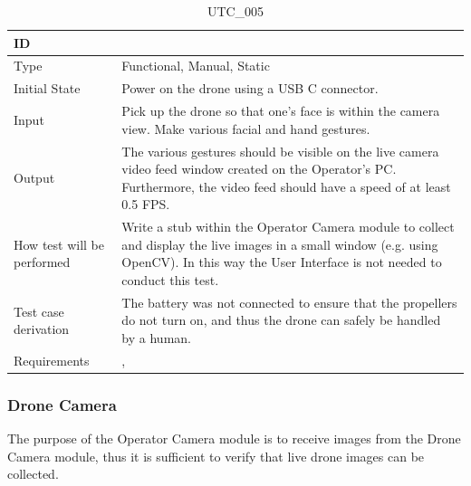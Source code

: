 \documentclass[12pt, titlepage]{article}
\begin{document}
\begin{table}[!h]
\begin{center}
\caption {UTC\_005}
\label{tab:UTC_005}
\begin{tabular}{ | m{3.2cm} | m{12.2cm} | } 
\hline
ID & \nameref{tab:UTC_005} \\ 
\hline
Type &  Functional, Manual, Static  \\ 
\hline
Initial State &  Power on the drone using a USB C connector. \\ 
\hline
Input & Pick up the drone so that one's face is within the camera view. Make various facial and hand gestures.\\ 
\hline
Output &  The various gestures should be visible on the live camera video feed window created on the Operator's PC. Furthermore, the video feed should have a speed of at least 0.5 FPS. \\ 
\hline
How test will be performed & Write a stub within the Operator Camera module to collect and display the live images in a small window (e.g. using OpenCV). In this way the User Interface is not needed to conduct this test. \\ 
\hline
Test case derivation &  The battery was not connected to ensure that the propellers do not turn on, and thus the drone can safely be handled by a human. \\ 
\hline
Requirements &  \nameref{GEN_002}, \nameref{PERF_004} \\ 
\hline
\end{tabular}
\end{center}
\end{table}

\clearpage

\subsubsection{Drone Camera}

The purpose of the Operator Camera module is to receive images from the Drone Camera module, thus it is sufficient to verify that live drone images can be collected.
\end{document}
